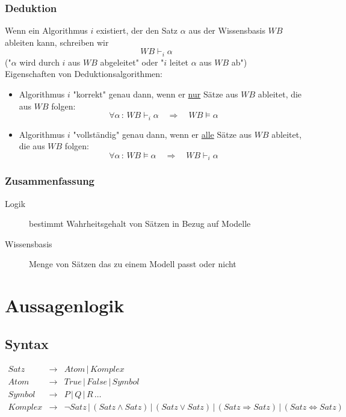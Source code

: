 \subsubsection*{Deduktion}

Wenn ein Algorithmus $i$ existiert, der den Satz $\alpha$ aus der Wissensbasis $WB$ ableiten kann, schreiben wir $$WB \vdash_i \alpha$$
("{}$\alpha$ wird durch $i$ aus $WB$ abgeleitet"{} oder "{}$i$ leitet $\alpha$ aus $WB$ ab"{}) \\[0,1cm]
Eigenschaften von Deduktionsalgorithmen:
\begin{itemize}
\item Algorithmus $i$ "{}korrekt"{} genau dann, wenn er \underline{nur} Sätze aus $WB$ ableitet, die aus $WB$ folgen: $$\forall \alpha \, : \, WB \vdash_i \alpha \quad \Rightarrow \quad WB \models \alpha$$
\item Algorithmus $i$ "{}vollständig"{} genau dann, wenn er \underline{alle} Sätze aus $WB$ ableitet, die aus $WB$ folgen: $$\forall \alpha \, : \, WB \models \alpha \quad \Rightarrow \quad WB \vdash_i \alpha$$
\end{itemize}

\subsubsection*{Zusammenfassung}

\begin{description}
	\item[Logik] bestimmt Wahrheitsgehalt von Sätzen in Bezug auf Modelle
	\item[Wissensbasis] Menge von Sätzen das zu einem Modell passt oder nicht
\end{description}

\section{Aussagenlogik}

\subsection{Syntax}

\begin{eqnarray*}
Satz &\to& Atom \, | \, Komplex \\ Atom &\to& True \, | \, False \, | \, Symbol \\ Symbol &\to& P \, | \, Q \, | \, R \, \dots \\
Komplex &\to& \neg Satz \, | \, (Satz \wedge Satz) \, | \, (Satz \vee Satz) \, | \, (Satz \Rightarrow Satz) \, | \, (Satz \Leftrightarrow Satz)
\end{eqnarray*}

